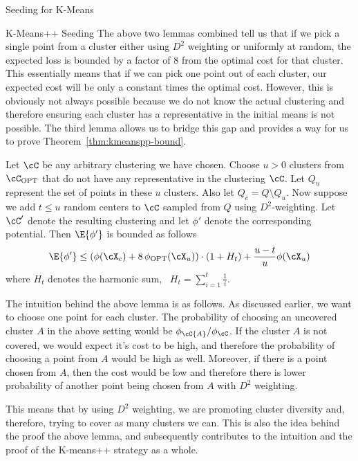 \documentclass[10pt]{article}
\newcommand{\opt}[1]{#1_{\text{OPT}}}
\begin{document}
\begin{psection}{Seeding for K-Means}
\begin{psubsection}{K-Means++ Seeding}
        The above two lemmas combined tell us that if we pick a single point from a
        cluster either using $D^2$ weighting or uniformly at random, the expected loss
        is bounded by a factor of 8 from the optimal cost for that cluster. This
        essentially means that if we can pick one point out of each cluster, our
        expected cost will be only a constant times the optimal cost. However, this is
        obviously not always possible because we do not know the actual clustering and
        therefore ensuring each cluster has a representative in the initial means is not
        possible. The third lemma allows us to bridge this gap and provides a way for us
        to prove Theorem~\ref{thm:kmeanspp-bound}.
    
        \begin{lemma}
            Let $\cC$ be any arbitrary clustering we have chosen. Choose $u > 0$
            clusters from $\opt{\cC}$ that do not have any representative in the
            clustering $\cC$. Let $Q_u$ represent the set of points in these $u$
            clusters. Also let $Q_c = Q \setminus Q_u$. Now suppose we add $t \le u$
            random centers to $\cC$ sampled from $Q$ using $D^2$-weighting. Let $\cC'$
            denote the resulting clustering and let $\phi'$ denote the corresponding
            potential. Then $\E{\phi'}$ is bounded as follows
            \begin{align*}
                \E{\phi'} \leq (\phi(\cX_c) + 8\,\opt{\phi}(\cX_u)) \cdot (1 + H_t) + \frac{u - t}{u} \phi(\cX_u)
            \end{align*}
            where $H_t$ denotes the harmonic sum, \ie\ $H_t = \sum_{i=1}^t \frac{1}{i}$.
        \end{lemma}
    
        The intuition behind the above lemma is as follows. As discussed earlier, we
        want to choose one point for each cluster. The probability of choosing an
        uncovered cluster $A$ in the above setting would be $\phi_\cC{A} / \phi_\cC$. If
        the cluster $A$ is not covered, we would expect it's cost to be high, and
        therefore the probability of choosing a point from $A$ would be high as well.
        Moreover, if there is a point chosen from $A$, then the cost would be low and
        therefore there is lower probability of another point being chosen from $A$ with
        $D^2$ weighting.
    
        This means that by using $D^2$ weighting, we are promoting cluster diversity
        and, therefore, trying to cover as many clusters we can. This is also the idea
        behind the proof the above lemma, and subsequently contributes to the intuition
        and the proof of the K-means++ strategy as a whole.


\end{psubsection}
\end{psection}
\end{document}

